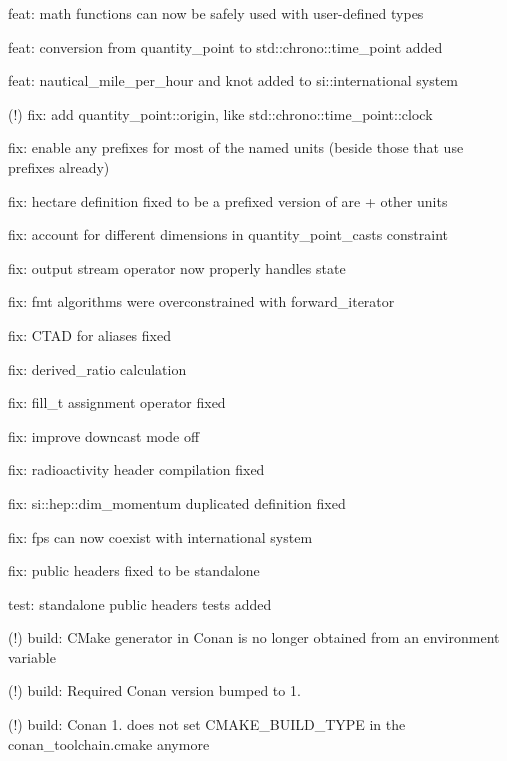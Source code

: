 \begin{DoxyItemize}
\begin{DoxyItemize}
\item feat\+: math functions can now be safely used with user-\/defined types
\item feat\+: conversion from {\ttfamily quantity\+\_\+point} to {\ttfamily std\+::chrono\+::time\+\_\+point} added
\item feat\+: {\ttfamily nautical\+\_\+mile\+\_\+per\+\_\+hour} and {\ttfamily knot} added to {\ttfamily si\+::international} system
\item (!) fix\+: add {\ttfamily quantity\+\_\+point\+::origin}, like {\ttfamily std\+::chrono\+::time\+\_\+point\+::clock}
\item fix\+: enable any prefixes for most of the named units (beside those that use prefixes already)
\item fix\+: {\ttfamily hectare} definition fixed to be a prefixed version of {\ttfamily are} + other units
\item fix\+: account for different dimensions in {\ttfamily quantity\+\_\+point\+\_\+cast}\textquotesingle{}s constraint
\item fix\+: output stream operator now properly handles state
\item fix\+: {\ttfamily fmt} algorithms were overconstrained with {\ttfamily forward\+\_\+iterator}
\item fix\+: CTAD for aliases fixed
\item fix\+: {\ttfamily derived\+\_\+ratio} calculation
\item fix\+: {\ttfamily fill\+\_\+t} assignment operator fixed
\item fix\+: improve downcast mode off
\item fix\+: {\ttfamily radioactivity} header compilation fixed
\item fix\+: {\ttfamily si\+::hep\+::dim\+\_\+momentum} duplicated definition fixed
\item fix\+: {\ttfamily fps} can now coexist with {\ttfamily international} system
\item fix\+: public headers fixed to be standalone
\item test\+: standalone public headers tests added
\item (!) build\+: CMake generator in Conan is no longer obtained from an environment variable
\item (!) build\+: Required Conan version bumped to 1.
\item (!) build\+: Conan 1. does not set {\ttfamily CMAKE\+\_\+\+BUILD\+\_\+\+TYPE} in the {\ttfamily conan\+\_\+toolchain.\+cmake} anymore

\end{DoxyItemize}
\end{DoxyItemize}
